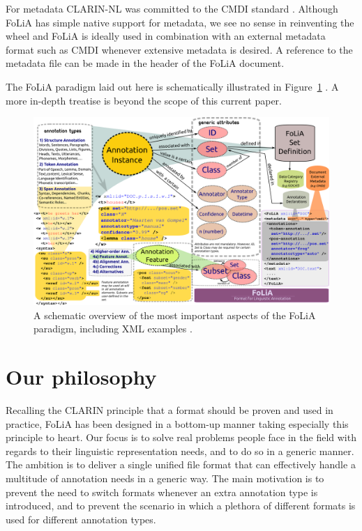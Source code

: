 \documentclass[a4paper,11pt]{article}
\begin{document}
For metadata CLARIN-NL was committed to the CMDI standard \cite{CMDI}.
Although FoLiA has simple native support for metadata, we see no
sense in reinventing the wheel and FoLiA is ideally used in combination with an
external metadata format such as CMDI whenever extensive metadata is desired. A
reference to the metadata file can be made in the header of the FoLiA document.

The FoLiA paradigm laid out here is schematically illustrated in
Figure~\ref{fig:paradigm} \cite{FOLIADOC2014}. A more in-depth treatise is beyond the scope of this
current paper.

\begin{figure}[h]
\begin{center}
\includegraphics[width=160.0mm]{folia_paradigm.png}
\end{center}
\caption{A schematic overview of the most important aspects of the FoLiA
paradigm, including XML examples \cite{FOLIADOC2014}.}
\label{fig:paradigm} 
\end{figure}

\section{Our philosophy}
\label{sec:philosophy}

Recalling the CLARIN principle that a format should be proven and used in
practice, FoLiA has been designed in a bottom-up manner taking especially this
principle to heart. Our focus is to solve real problems people face in the
field with regards to their linguistic representation needs, and to do so in a
generic manner. The ambition is to deliver a single unified file format that
can effectively handle a multitude of annotation needs in a generic way.
The main motivation is to prevent the need to switch formats whenever an extra
annotation type is introduced, and to prevent the scenario in which a plethora
of different formats is used for different annotation types.
\end{document}
